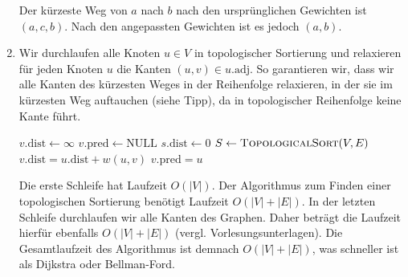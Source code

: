 \documentclass[11pt,a4paper]{article}
\begin{document}
\begin{loesung}
\begin{enumerate}
\begin{figure}[h!]
\begin{subfigure}{0.2\textwidth}
            \end{subfigure}
        \end{figure}
        \FloatBarrier
        Der kürzeste Weg von $a$ nach $b$ nach den ursprünglichen Gewichten ist $(a, c, b)$.
        Nach den angepassten Gewichten ist es jedoch $(a, b)$.

        \item
        Wir durchlaufen alle Knoten $u \in V$ in topologischer Sortierung und relaxieren für jeden Knoten $u$ die Kanten $(u, v) \in u.\mathrm{adj}$.
        So garantieren wir, dass wir alle Kanten des kürzesten Weges in der Reihenfolge relaxieren, in der sie im kürzesten Weg auftauchen (siehe Tipp), da in topologischer Reihenfolge keine Kante  führt.
        \begin{algorithmic}[1]
                    \State $v.\mathrm{dist} \gets \infty$
                    \State $v.\mathrm{pred} \gets \mathrm{NULL}$
                \EndFor
                \State $s.\mathrm{dist} \gets 0$
                \State $S \gets \text{\textsc{TopologicalSort}}(V, E)$
                            \State $v.\mathrm{dist} = u.\mathrm{dist} + w(u, v)$
                            \State $v.\mathrm{pred} = u$
                        \EndIf
                    \EndFor
                \EndFor
            \EndProcedure
        \end{algorithmic}
        Die erste Schleife hat Laufzeit $O(|V|)$.
        Der Algorithmus zum Finden einer topologischen Sortierung benötigt Laufzeit $O(|V| + |E|)$.
        In der letzten Schleife durchlaufen wir alle Kanten des Graphen.
        Daher beträgt die Laufzeit hierfür ebenfalls $O(|V| + |E|)$ (vergl. Vorlesungsunterlagen).
        Die Gesamtlaufzeit des Algorithmus ist demnach $O(|V| + |E|)$, was schneller ist als Dijkstra oder Bellman-Ford.
    \end{enumerate}
\end{loesung}
\end{document}
